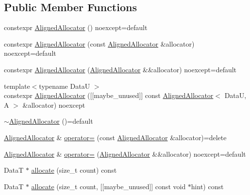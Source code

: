 \subsection*{Public Member Functions}
\begin{DoxyCompactItemize}
\item 
constexpr \mbox{\hyperlink{classmage_1_1_aligned_allocator_ac44b92fc537e8caed25f9aceab419890}{Aligned\+Allocator}} () noexcept=default
\item 
constexpr \mbox{\hyperlink{classmage_1_1_aligned_allocator_a8dad1465c9c3c36f60f7bf9ca78e5e78}{Aligned\+Allocator}} (const \mbox{\hyperlink{classmage_1_1_aligned_allocator}{Aligned\+Allocator}} \&allocator) noexcept=default
\item 
constexpr \mbox{\hyperlink{classmage_1_1_aligned_allocator_abb18e578e653ebfaa76523f2c0e1ce70}{Aligned\+Allocator}} (\mbox{\hyperlink{classmage_1_1_aligned_allocator}{Aligned\+Allocator}} \&\&allocator) noexcept=default
\item 
{\footnotesize template$<$typename DataU $>$ }\\constexpr \mbox{\hyperlink{classmage_1_1_aligned_allocator_a4320981934c5b21e685b209a263eba21}{Aligned\+Allocator}} (\mbox{[}\mbox{[}maybe\+\_\+unused\mbox{]}\mbox{]} const \mbox{\hyperlink{classmage_1_1_aligned_allocator}{Aligned\+Allocator}}$<$ DataU, A $>$ \&allocator) noexcept
\item 
\mbox{\hyperlink{classmage_1_1_aligned_allocator_a58be008401a5bde96845cb44daaabca0}{$\sim$\+Aligned\+Allocator}} ()=default
\item 
\mbox{\hyperlink{classmage_1_1_aligned_allocator}{Aligned\+Allocator}} \& \mbox{\hyperlink{classmage_1_1_aligned_allocator_a3b690408a1792033b64bd6f75f428e01}{operator=}} (const \mbox{\hyperlink{classmage_1_1_aligned_allocator}{Aligned\+Allocator}} \&allocator)=delete
\item 
\mbox{\hyperlink{classmage_1_1_aligned_allocator}{Aligned\+Allocator}} \& \mbox{\hyperlink{classmage_1_1_aligned_allocator_a6e1062c58675532ee10b68f19c2a7293}{operator=}} (\mbox{\hyperlink{classmage_1_1_aligned_allocator}{Aligned\+Allocator}} \&\&allocator) noexcept=default
\item 
DataT $\ast$ \mbox{\hyperlink{classmage_1_1_aligned_allocator_a36b9cadd671e1de11e9b6534887881be}{allocate}} (size\+\_\+t count) const
\item 
DataT $\ast$ \mbox{\hyperlink{classmage_1_1_aligned_allocator_aeef56b84f3e0fd02181550b93f10c8e7}{allocate}} (size\+\_\+t count, \mbox{[}\mbox{[}maybe\+\_\+unused\mbox{]}\mbox{]} const void $\ast$hint) const

\end{DoxyCompactItemize}
